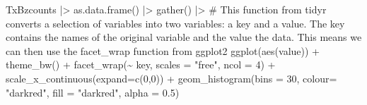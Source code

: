 \documentclass[
  letterpaper,
  DIV=11,
  numbers=noendperiod]{scrreprt}
\newenvironment{Shaded}{\begin{snugshade}}{\end{snugshade}}
\newcommand{\AttributeTok}[1]{\textcolor[rgb]{0.40,0.45,0.13}{#1}}
\newcommand{\CommentTok}[1]{\textcolor[rgb]{0.37,0.37,0.37}{#1}}
\newcommand{\DecValTok}[1]{\textcolor[rgb]{0.68,0.00,0.00}{#1}}
\newcommand{\FloatTok}[1]{\textcolor[rgb]{0.68,0.00,0.00}{#1}}
\newcommand{\FunctionTok}[1]{\textcolor[rgb]{0.28,0.35,0.67}{#1}}
\newcommand{\NormalTok}[1]{\textcolor[rgb]{0.00,0.23,0.31}{#1}}
\newcommand{\SpecialCharTok}[1]{\textcolor[rgb]{0.37,0.37,0.37}{#1}}
\newcommand{\StringTok}[1]{\textcolor[rgb]{0.13,0.47,0.30}{#1}}
\begin{document}
\begin{Shaded}
\begin{Highlighting}[]
\NormalTok{TxBzcounts }\SpecialCharTok{|\textgreater{}} 
  \FunctionTok{as.data.frame}\NormalTok{() }\SpecialCharTok{|\textgreater{}}  
  \FunctionTok{gather}\NormalTok{() }\SpecialCharTok{|\textgreater{}}  \CommentTok{\# This function from tidyr converts a selection of variables into two variables: a key and a value. The key contains the names of the original variable and the value the data. This means we can then use the facet\_wrap function from ggplot2}
  \FunctionTok{ggplot}\NormalTok{(}\FunctionTok{aes}\NormalTok{(value)) }\SpecialCharTok{+}
    \FunctionTok{theme\_bw}\NormalTok{() }\SpecialCharTok{+}
    \FunctionTok{facet\_wrap}\NormalTok{(}\SpecialCharTok{\textasciitilde{}}\NormalTok{ key, }\AttributeTok{scales =} \StringTok{"free"}\NormalTok{, }\AttributeTok{ncol =} \DecValTok{4}\NormalTok{) }\SpecialCharTok{+}
    \FunctionTok{scale\_x\_continuous}\NormalTok{(}\AttributeTok{expand=}\FunctionTok{c}\NormalTok{(}\DecValTok{0}\NormalTok{,}\DecValTok{0}\NormalTok{)) }\SpecialCharTok{+}
    \FunctionTok{geom\_histogram}\NormalTok{(}\AttributeTok{bins =} \DecValTok{30}\NormalTok{, }\AttributeTok{colour=} \StringTok{"darkred"}\NormalTok{, }\AttributeTok{fill =} \StringTok{"darkred"}\NormalTok{, }\AttributeTok{alpha =} \FloatTok{0.5}\NormalTok{)}
\end{Highlighting}
\end{Shaded}
\end{document}
